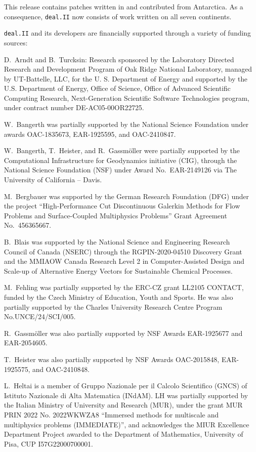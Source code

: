\documentclass{ansarticle-preprint}
\newcommand{\specialword}[1]{\texttt{#1}}
\newcommand{\dealii}{{\specialword{deal.II}}\xspace}
\begin{document}
This release contains patches written in and contributed from
Antarctica. As a consequence, \dealii{} now consists of work written
on all seven continents.

\bigskip

\dealii and its developers are financially supported through a
variety of funding sources:

D.~Arndt and B.~Turcksin: Research sponsored by the Laboratory Directed Research and
Development Program of Oak Ridge National Laboratory, managed by UT-Battelle,
LLC, for the U. S. Department of Energy and supported by the U.S. Department of Energy,
Office of Science, Office of Advanced Scientific Computing Research,
Next-Generation Scientific Software Technologies program, under contract
number DE-AC05-00OR22725.

W.~Bangerth was partially supported by the National Science Foundation
under awards OAC-1835673, EAR-1925595, and OAC-2410847.

W.~Bangerth, T.~Heister, and R.~Gassm\"{o}ller were partially
supported by the Computational Infrastructure for Geodynamics initiative
(CIG), through the National Science Foundation (NSF) under Award
No.~EAR-2149126 via The University of California -- Davis.

M.~Bergbauer was supported by the German Research Foundation (DFG) under the
project ``High-Performance Cut Discontinuous Galerkin Methods for Flow
Problems and Surface-Coupled Multiphysics Problems'' Grant Agreement
No.~456365667.

B.~Blais was supported by the National Science and Engineering Research Council of Canada (NSERC)  through the RGPIN-2020-04510 Discovery Grant and the MMIAOW Canada Research Level 2 in Computer-Assisted Design and Scale-up of Alternative Energy Vectors for Sustainable Chemical Processes.

M.~Fehling was partially supported by the ERC-CZ grant LL2105 CONTACT,
funded by the Czech Ministry of Education, Youth and Sports. He was also
partially supported by the Charles University Research Centre Program No.\@ UNCE/24/SCI/005.

R.~Gassm\"{o}ller was also partially supported by NSF Awards EAR-1925677
and EAR-2054605.

T.~Heister was also partially supported by NSF Awards OAC-2015848, EAR-1925575, and OAC-2410848.

L.~Heltai is a member of Gruppo Nazionale per il Calcolo Scientifico (GNCS) of
Istituto Nazionale di Alta Matematica (INdAM). LH was partially supported by
the Italian Ministry of University and Research (MUR), under the grant MUR PRIN
2022 No. 2022WKWZA8 ``Immersed methods for multiscale and multiphysics problems
(IMMEDIATE)'', and acknowledges the MIUR Excellence Department Project awarded
to the Department of Mathematics, University of Pisa, CUP I57G22000700001.
\end{document}
